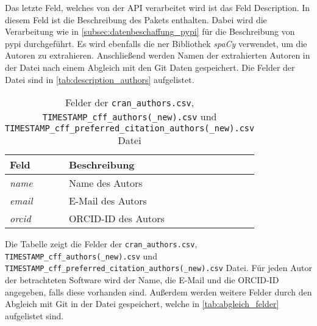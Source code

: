 Das letzte Feld, welches von der API verarbeitet wird ist das Feld \glqq Description\grqq{}.
In diesem Feld ist die Beschreibung des Pakets enthalten.
Dabei wird die Verarbeitung wie in \autoref{subsec:datenbeschaffung_pypi} für die Beschreibung von \gls{pypi} durchgeführt.
Es wird ebenfalls die \gls{ner} Bibliothek \emph{spaCy} verwendet, um die Autoren zu extrahieren.
Anschließend werden Namen der extrahierten Autoren in der Datei  nach einem Abgleich mit den Git Daten gespeichert.
Die Felder der Datei sind in \autoref{tab:description_authors} aufgelistet.

\begin{table}
    \centering
    \begin{tabularx}{\textwidth}{XL{10.2cm}}
        \toprule
        \textbf{Feld} & \textbf{Beschreibung} \\ \midrule
        \emph{name}   & Name des Autors       \\
        \emph{email}  & E-Mail des Autors     \\
        \emph{orcid}  & ORCID-ID des Autors   \\
        \bottomrule
    \end{tabularx}
    \caption{Felder der \texttt{cran\_authors.csv}, \texttt{TIMESTAMP\_cff\_authors(\_new).csv} und \texttt{TIMESTAMP\_cff\_preferred\_citation\_authors(\_new).csv} Datei}
    \label{tab:cran_authors}
    \small
    \raggedright
    Die Tabelle zeigt die Felder der \texttt{cran\_authors.csv}, \texttt{TIMESTAMP\_cff\_authors(\_new).csv} und \texttt{TIMESTAMP\_cff\_preferred\_citation\_authors(\_new).csv} Datei. Für jeden Autor der betrachteten Software wird der Name, die E-Mail und die ORCID-ID angegeben, falls diese vorhanden sind. Außerdem werden weitere Felder durch den Abgleich mit Git in der Datei gespeichert, welche in \autoref{tab:abgleich_felder} aufgelistet sind.
\end{table}
